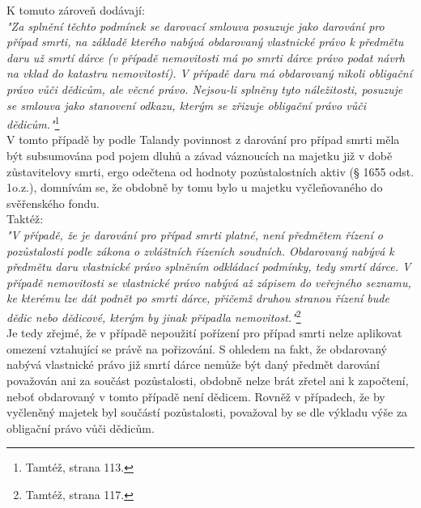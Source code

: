 \documentclass{article}
\begin{document}
K tomuto zároveň dodávají:\\

\textit{"Za splnění těchto podmínek se darovací smlouva posuzuje jako darování pro případ smrti, na základě kterého nabývá obdarovaný vlastnické právo k předmětu daru už smrtí dárce (v případě nemovitosti má po smrti dárce právo podat návrh na vklad do katastru nemovitostí). V případě daru má obdarovaný nikoli obligační právo vůči dědicům, ale věcné právo. Nejsou-li splněny tyto náležitosti, posuzuje se smlouva jako stanovení odkazu, kterým se zřizuje obligační právo vůči dědicům."}\footnote{Tamtéž, strana 113.}\\

V tomto případě by podle Talandy povinnost z darování pro případ smrti měla být subsumována pod pojem dluhů a závad váznoucích na majetku již v době zůstavitelovy smrti, ergo odečtena od hodnoty pozůstalostních aktiv (§ 1655 odst. 1o.z.), domnívám se, že obdobně by tomu bylo u majetku vyčleňovaného do svěřenského fondu.\\

Taktéž:\\

\textit{"V případě, že je darování pro případ smrti platné, není předmětem řízení o pozůstalosti podle zákona o zvláštních řízeních soudních. Obdarovaný nabývá k předmětu daru vlastnické právo splněním odkládací podmínky, tedy smrtí dárce. V případě nemovitosti se vlastnické právo nabývá až zápisem do veřejného seznamu, ke kterému lze dát podnět po smrti dárce, přičemž druhou stranou řízení bude dědic nebo dědicové, kterým by jinak připadla nemovitost."}\footnote{Tamtéž, strana 117.}\\

Je tedy zřejmé, že v případě nepoužití pořízení pro případ smrti nelze aplikovat omezení vztahující se právě na pořizování. S ohledem na fakt, že obdarovaný nabývá vlastnické právo již smrtí dárce nemůže být daný předmět darování považován ani za součást pozůstalosti, obdobně nelze brát zřetel ani k započtení, neboť obdarovaný v tomto případě není dědicem. Rovněž v případech, že by vyčleněný majetek byl součástí pozůstalosti, považoval by se dle výkladu výše za obligační právo vůči dědicům.\\

\end{document}
